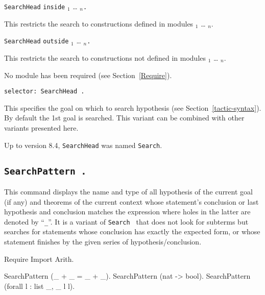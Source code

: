 \begin{Variants}
\item
{\tt SearchHead} {\term} {\tt inside} {\module$_1$} \ldots{} {\module$_n$}{\tt .}

This restricts the search to constructions defined in modules
{\module$_1$} \ldots{} {\module$_n$}.

\item {\tt SearchHead} {\term} {\tt outside} {\module$_1$} \ldots{} {\module$_n$}{\tt .}

This restricts the search to constructions not defined in modules
{\module$_1$} \ldots{} {\module$_n$}.

\begin{ErrMsgs}
\item {}
No module \module{} has been required (see Section~\ref{Require}).
\end{ErrMsgs}

\item {\tt selector: SearchHead {\term}.}

  This specifies the goal on which to search hypothesis (see
  Section~\ref{tactic-syntax}). By default the 1st goal is searched.
  This variant can be combined with other variants presented here.

\end{Variants}

\Warning Up to {\Coq} version 8.4, {\tt SearchHead} was named {\tt Search}.

\subsection[\tt SearchPattern {\termpattern}.]{\tt SearchPattern {\term}.}

This command displays the name and type of all hypothesis of the
current goal (if any) and theorems of the current context whose statement's
conclusion or last hypothesis and conclusion matches the expression
{\term} where holes in the latter are denoted by ``{\texttt \_}''. It
is a variant of {\tt Search
  {\termpattern}} that does not look for subterms but searches for
statements whose conclusion has exactly the expected form, or whose
statement finishes by the given series of hypothesis/conclusion.

\begin{coq_example*}
Require Import Arith.
\end{coq_example*}
\begin{coq_example}
SearchPattern (_ + _ = _ + _).
SearchPattern (nat -> bool).
SearchPattern (forall l : list _, _ l l).
\end{coq_example}

